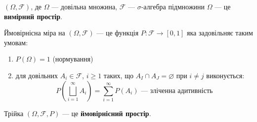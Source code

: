\begin{definition}
    $(\Omega, \mathcal{F})$, де $\Omega$ --- довільна множина,
    $\mathcal{F}$ --- $\sigma$-алгебра підмножини  
    $\Omega$ --- це \textbf{вимірний простір}.
\end{definition}

\begin{definition}
    Ймовірнісна міра на $(\Omega, \mathcal{F})$ --- це функція 
    $P: \mathcal{F} \rightarrow [0, 1]$ яка  задовільняє таким
    умовам:
    \begin{enumerate}
        \item $P(\Omega) = 1$ (нормування)
        \item для довільних $A_i \in \mathcal{F}$, $i \geqslant 1$
        таких, що $A_I \cap A_J = \varnothing$ при $i \neq j$ виконується:
        $$P(\bigsqcup\limits_{i = 1}^{\infty} A_i) = \sum\limits_{i=1}^{\infty} P(A_i) \text{ --- зліченна адитивність}$$
    \end{enumerate}
\end{definition}

\begin{definition}
    Трійка $(\Omega, \mathcal{F}, P)$ --- це \textbf{ймовірнісний простір}.
\end{definition}


